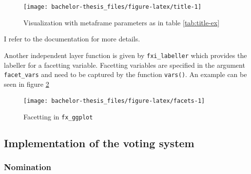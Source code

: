 \documentclass[]{report}
\newenvironment{Shaded}{\begin{snugshade}}{\end{snugshade}}
\newcommand{\KeywordTok}[1]{\textcolor[rgb]{0.13,0.29,0.53}{\textbf{#1}}}
\newcommand{\DataTypeTok}[1]{\textcolor[rgb]{0.13,0.29,0.53}{#1}}
\newcommand{\DecValTok}[1]{\textcolor[rgb]{0.00,0.00,0.81}{#1}}
\newcommand{\StringTok}[1]{\textcolor[rgb]{0.31,0.60,0.02}{#1}}
\newcommand{\OperatorTok}[1]{\textcolor[rgb]{0.81,0.36,0.00}{\textbf{#1}}}
\newcommand{\NormalTok}[1]{#1}
\theoremstyle{definition}
\theoremstyle{definition}
\theoremstyle{definition}
\theoremstyle{remark}
\begin{document}
\begin{figure}

{\centering \texttt{[image: bachelor-thesis\_files/figure-latex/title-1]} 

}

\caption{Visualization with metaframe parameters as in table
\ref{tab:title-ex}}\label{fig:title}
\end{figure}




I refer to the documentation for more details.

Another independent layer function is given by \texttt{fxi\_labeller}
which provides the labeller for a facetting variable. Facetting
variables are specified in the argument \texttt{facet\_vars} and need to
be captured by the function \texttt{vars()}. An example can be seen in
figure \ref{fig:facets}

\begin{Shaded}
\end{Shaded}

\begin{figure}

{\centering \texttt{[image: bachelor-thesis\_files/figure-latex/facets-1]} 

}

\caption{Facetting in \texttt{fx\_ggplot}}\label{fig:facets}
\end{figure}



\subsection{Implementation of the voting
system}\label{implementation-of-the-voting-system}

\subsubsection{Nomination}\label{nomination}
\end{document}
